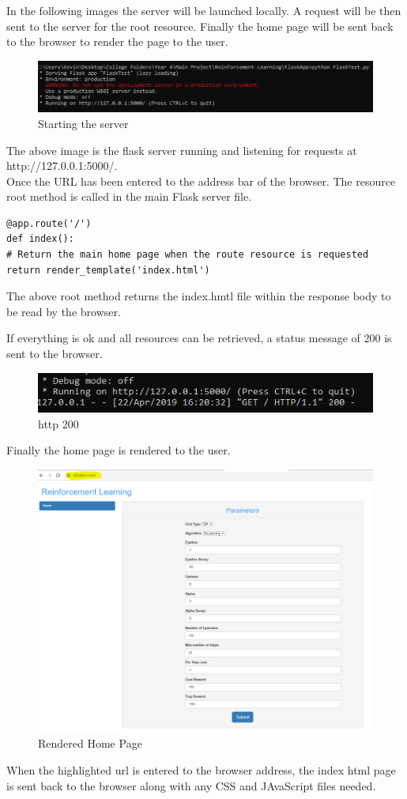 In the following images the server will be launched locally. A request will be then sent to the server for the root resource. Finally the home page will be sent back to the browser to render the page to the user.

\begin{figure}[H]
	\centering
	\includegraphics[width=0.9\linewidth]{img/flaskCmd}
	\caption{Starting the server}
	\label{fig:flaskcmd}
\end{figure}
The above image is the flask server running and listening for requests at http://127.0.0.1:5000/.\\
Once the URL has been entered to the address bar of the browser. 
The resource root method is called in the main Flask server file.
\begin{verbatim}
@app.route('/')
def index():
# Return the main home page when the route resource is requested
return render_template('index.html')
\end{verbatim}
The above root method returns the index.hmtl file within the response body to be read by the browser.

If everything is ok and all resources can be retrieved, a status message of 200 is sent to the browser.
\begin{figure}[H]
	\centering
	\includegraphics[width=0.9\linewidth]{img/http200}
	\caption{http 200}
	\label{fig:http200}
\end{figure}

Finally the home page is rendered to the user.
\begin{figure}[H]
	\centering
	\includegraphics[width=0.9\linewidth]{img/homePage}
	\caption{Rendered Home Page}
	\label{fig:homepage}
\end{figure}
When the highlighted url is entered to the browser address, the index html page is sent back to the browser along with any CSS and JAvaScript files needed.

